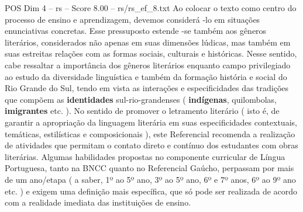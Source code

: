 \begin{textsample}{POS Dim 4 – rs – Score 8.00 – rs/rs\_ef\_8.txt}
Ao colocar o texto como centro do processo de ensino e aprendizagem, devemos considerá -lo em situações enunciativas concretas.
Esse pressuposto estende -se também aos gêneros literários, considerados não apenas em suas dimensões lúdicas, mas também em suas estreitas relações com as formas sociais, culturais e históricas.
Nesse sentido, cabe ressaltar a importância dos gêneros literários enquanto campo privilegiado ao estudo da diversidade linguística e também da formação história e social do Rio Grande do Sul, tendo em vista as interações e especificidades das tradições que compõem as \textbf{identidades} sul-rio-grandenses ( \textbf{indígenas}, quilombolas, \textbf{imigrantes} etc. ).
No sentido de promover o letramento literário ( isto é, de garantir a apropriação da linguagem literária em suas especificidades contextuais, temáticas, estilísticas e composicionais ), este Referencial recomenda a realização de atividades que permitam o contato direto e contínuo dos estudantes com obras literárias.
Algumas habilidades propostas no componente curricular de Língua Portuguesa, tanto na BNCC quanto no Referencial Gaúcho, perpassam por mais de um ano/etapa ( a saber, 1º ao 5º ano, 3º ao 5º ano, 6º e 7º anos, 6º ao 9º ano etc. ) e exigem uma definição mais específica, que só pode ser realizada de acordo com a realidade imediata das instituições de ensino.

\end{textsample}
